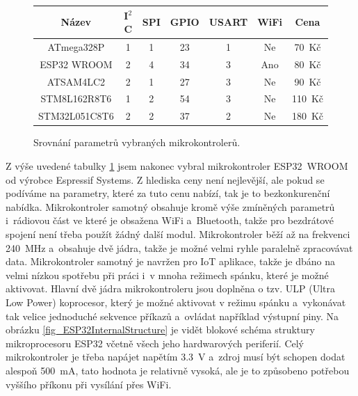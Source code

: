 \begin{figure}[h]
    \centering
    \begin{tabular}{c|cccccc}
        \textbf{Název}                         & \textbf{I$^2$C} & \textbf{SPI} & \textbf{GPIO} & \textbf{USART} & \textbf{WiFi} & \textbf{Cena} \\ \hline
        ATmega328P \cite{dat_ATmega328p}       & 1 & 1 & 23 & 1 & Ne  & 70~Kč \\
        ESP32 WROOM \cite{dat_ESP32-WROOM}     & 2 & 4 & 34 & 3 & Ano & 80~Kč \\
        ATSAM4LC2 \cite{dat_ATSAM4LC2}         & 2 & 1 & 27 & 3 & Ne  & 90~Kč \\
        STM8L162R8T6 \cite{dat_STM8L162R8T6}   & 1 & 2 & 54 & 3 & Ne  & 110~Kč \\
        STM32L051C8T6 \cite{dat_STM32L051C8T6} & 2 & 2 & 37 & 2 & Ne  & 180~Kč
        
    \end{tabular}
    \caption{Srovnání parametrů vybraných mikrokontrolerů.}
    \label{tab_MCU}
\end{figure}

Z výše uvedené tabulky \ref{tab_MCU} jsem nakonec vybral mikrokontroler ESP32~WROOM od výrobce Espressif Systems. Z hlediska ceny není nejlevější, ale pokud se podíváme na parametry, které za tuto cenu nabízí, tak je to bezkonkurenční nabídka. Mikrokontroler samotný obsahuje kromě výše zmíněných parametrů i~rádiovou část ve které je obsažena WiFi a~Bluetooth, takže pro bezdrátové spojení není třeba použít žádný další modul. Mikrokontroler běží až na frekvenci \SI{240}{\mega\hertz} a~obsahuje dvě jádra, takže je možné velmi ryhle paralelně zpracovávat data. Mikrokontroler samotný je navržen pro IoT aplikace, takže je dbáno na velmi nízkou spotřebu při práci i~v mnoha režimech spánku, které je možné aktivovat. Hlavní dvě jádra mikrokontroleru jsou doplněna o tzv. ULP (Ultra Low Power) koprocesor, který je možné aktivovat v režimu spánku a~vykonávat tak velice jednoduché sekvence příkazů a~ovládat například výstupní piny. Na obrázku \ref{fig_ESP32InternalStructure} je vidět blokové schéma struktury mikroprocesoru ESP32 včetně všech jeho hardwarových periferií. Celý mikrokontroler je třeba napájet napětím \SI{3,3}{\volt} a~zdroj musí být schopen dodat alespoň \SI{500}{\milli\ampere}, tato hodnota je relativně vysoká, ale je to způsobeno potřebou vyššího příkonu při vysílání přes WiFi.

